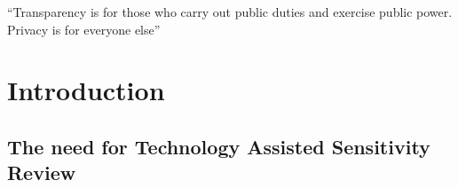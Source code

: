 \documentclass[\version]{l4proj}
\begin{document}
\newpage

\vspace*{\fill}

\epigraph{\Large{``Transparency is for those who carry out public duties and exercise public power. Privacy is for everyone else''}}{}

\vspace*{\fill}

\tableofcontents

%
%
%
%
%
%
%
%



\chapter{Introduction}


\section{The need for Technology Assisted Sensitivity Review}
\end{document}
